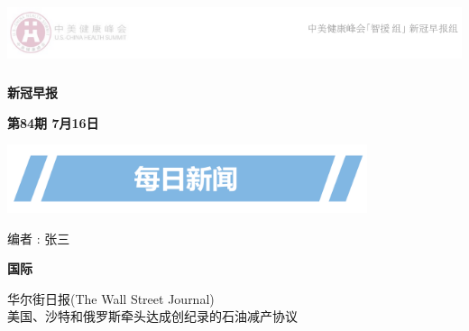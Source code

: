\documentclass[]{article}
\author{}
\date{\vspace{-2.5em}}
\begin{document}
\fontsize{22}{22}
\selectfont
\vspace{-10truemm}

\newcommand{\resheading}[1]{%
  \noindent\fcolorbox{lavenderblush}{lavenderblush}{\makebox[\dimexpr\textwidth-2\fboxsep-2\fboxrule][c]{\textbf{~#1}}}%
}

\newcommand\fnote[1]{\captionsetup{font=large}\caption*{#1}}

\begin{center}
\includegraphics[height=2cm]{./input/logo2.png} 
\end{center}

\begin{center}
\fontsize{45}{45}
\textcolor{glaucous}{\textbf{新冠早报}}
\end{center}

\begin{center}
\fontsize{22}{22}
{\textcolor{glaucous}{\textbf{第84期 \space 7月16日}}}
\end{center}

\vspace{2mm}
\begin{center}
\includegraphics[height=2cm]{./input/title1.png} 
\end{center}

\begin{center}
编者 : 张三
\end{center}

\vspace{-5mm}

\begin{huge}{\textcolor{glaucous}{\textbf{国际}}}\end{huge}

\vspace{-3mm}

\begin{center}
\textcolor{glaucous}{华尔街日报(The Wall Street Journal)}\\美国、沙特和俄罗斯牵头达成创纪录的石油减产协议

\end{center}
\end{document}
